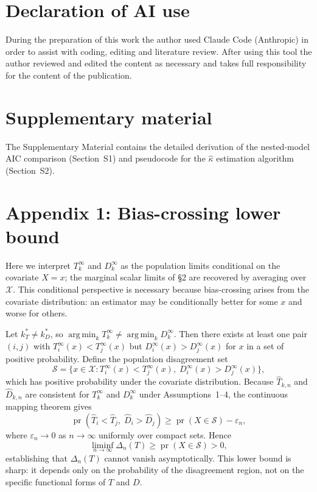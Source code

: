 \documentclass[lineno]{biometrika}
\DeclareMathOperator{\argmin}{arg\,min}
\DeclareMathOperator{\pr}{pr}
\begin{document}
\section*{Declaration of AI use}
During the preparation of this work the author used Claude Code (Anthropic) in order to assist with coding, editing and literature review. After using this tool the author reviewed and edited the content as necessary and takes full responsibility for the content of the publication.

\section*{Supplementary material}
The Supplementary Material contains the detailed derivation of the nested-model AIC comparison (Section~S1) and pseudocode for the $\hat\kappa$ estimation algorithm (Section~S2).

\renewcommand{\tablename}{Table}
\appendix
\appendixone
\section*{Appendix 1: Bias-crossing lower bound}

Here we interpret $T_k^\infty$ and $D_k^\infty$ as the population limits conditional on the covariate $X=x$; the marginal scalar limits of \S2 are recovered by averaging over $\mathcal{X}$. This conditional perspective is necessary because bias-crossing arises from the covariate distribution: an estimator may be conditionally better for some $x$ and worse for others.

Let $k_T^* \neq k_D^*$, so $\argmin_k T_k^\infty \neq \argmin_k D_k^\infty$. Then there exists at least one pair $(i,j)$ with $T_i^\infty(x) < T_j^\infty(x)$ but $D_i^\infty(x) > D_j^\infty(x)$ for $x$ in a set of positive probability. Define the population disagreement set
\[
\mathcal{S} = \{x \in \mathcal{X} : T_i^\infty(x) < T_j^\infty(x),\; D_i^\infty(x) > D_j^\infty(x)\},
\]
which has positive probability under the covariate distribution. Because $\hat T_{k,n}$ and $\hat D_{k,n}$ are consistent for $T_k^\infty$ and $D_k^\infty$ under Assumptions~1--4, the continuous mapping theorem gives
\[
\pr(\hat T_i < \hat T_j,\; \hat D_i > \hat D_j) \geq \pr(X \in \mathcal{S}) - \varepsilon_n,
\]
where $\varepsilon_n \to 0$ as $n\to\infty$ uniformly over compact sets. Hence
\[
\liminf_{n\to\infty} \Delta_n(T) \geq \pr(X \in \mathcal{S}) > 0,
\]
establishing that $\Delta_n(T)$ cannot vanish asymptotically. This lower bound is sharp: it depends only on the probability of the disagreement region, not on the specific functional forms of $T$ and $D$.
\end{document}

